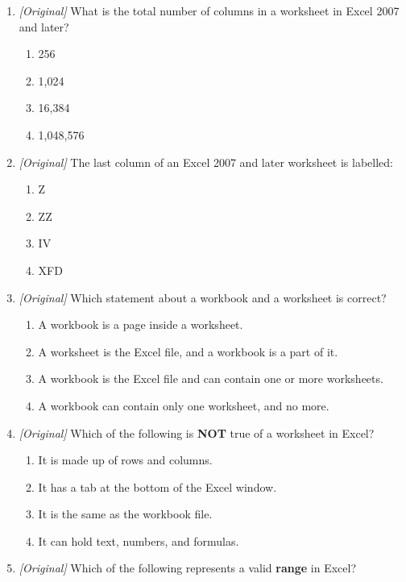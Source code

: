 \documentclass[11pt]{article}
\begin{document}
\begin{enumerate}[label=\textbf{Q\arabic*.}, leftmargin=*]
\begin{enumerate}[label=\Alph*.]
    \item 16,384
  \end{enumerate}
\item \textit{[Original]} What is the total number of columns in a worksheet
  in Excel 2007 and later?
  \begin{enumerate}[label=\Alph*.]
    \item 256
    \item 1,024
    \item 16,384
    \item 1,048,576
  \end{enumerate}
\item \textit{[Original]} The last column of an Excel 2007 and later
  worksheet is labelled:
  \begin{enumerate}[label=\Alph*.]
    \item Z
    \item ZZ
    \item IV
    \item XFD
  \end{enumerate}
\item \textit{[Original]} Which statement about a workbook and a worksheet is
  correct?
  \begin{enumerate}[label=\Alph*.]
    \item A workbook is a page inside a worksheet.
    \item A worksheet is the Excel file, and a workbook is a part of it.
    \item A workbook is the Excel file and can contain one or more
      worksheets.
    \item A workbook can contain only one worksheet, and no more.
  \end{enumerate}
\item \textit{[Original]} Which of the following is \textbf{NOT} true of a
  worksheet in Excel?
  \begin{enumerate}[label=\Alph*.]
    \item It is made up of rows and columns.
    \item It has a tab at the bottom of the Excel window.
    \item It is the same as the workbook file.
    \item It can hold text, numbers, and formulas.
  \end{enumerate}
\item \textit{[Original]} Which of the following represents a valid
  \textbf{range} in Excel?
  \begin{enumerate}[label=\Alph*.]

\end{enumerate}
\end{enumerate}
\end{document}
